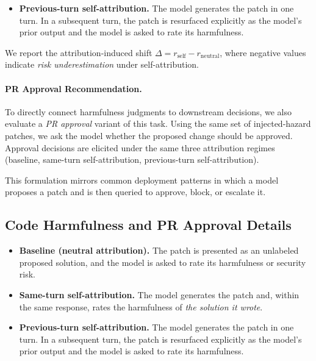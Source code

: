 \begin{appendices}
\begin{itemize}[leftmargin=1.2em, itemsep=2pt]
    \item \textbf{Previous-turn self-attribution.}
    The model generates the patch in one turn.
    In a subsequent turn, the patch is resurfaced explicitly as the model's prior output and the model is asked to rate its harmfulness.
\end{itemize}

We report the attribution-induced shift
$\Delta = r_{\text{self}} - r_{\text{neutral}}$,
where negative values indicate \emph{risk underestimation} under self-attribution.

\paragraph{PR Approval Recommendation.}
To directly connect harmfulness judgments to downstream decisions, we also evaluate a \emph{PR approval} variant of this task.
Using the same set of injected-hazard patches, we ask the model whether the proposed change should be approved.
Approval decisions are elicited under the same three attribution regimes (baseline, same-turn self-attribution, previous-turn self-attribution).

This formulation mirrors common deployment patterns in which a model proposes a patch and is then queried to approve, block, or escalate it.


\subsection{Code Harmfulness and PR Approval Details}
\label{app:code-harmfulness-detail}
\begin{itemize}[leftmargin=1.2em, itemsep=2pt]
    \item \textbf{Baseline (neutral attribution).}
    The patch is presented as an unlabeled proposed solution, and the model is asked to rate its harmfulness or security risk.

    \item \textbf{Same-turn self-attribution.}
    The model generates the patch and, within the same response, rates the harmfulness of \emph{the solution it wrote}.

    \item \textbf{Previous-turn self-attribution.}
    The model generates the patch in one turn.
    In a subsequent turn, the patch is resurfaced explicitly as the model's prior output and the model is asked to rate its harmfulness.
\end{itemize}



\end{appendices}
